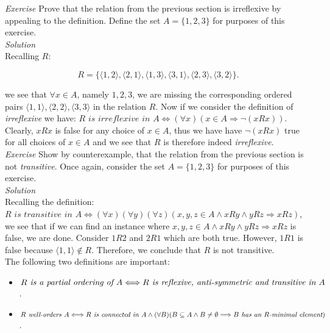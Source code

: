 \textit{Exercise} Prove that the relation from the previous section is irreflexive by appealing to the definition.  Define the set $A=\{1,2,3\}$ for purposes of this exercise.\\

\textit{Solution}\\

Recalling $R$:

\begin{displaymath}
R=\{\langle 1,2 \rangle, \langle 2,1 \rangle,  \langle 1,3 \rangle,  \langle 3,1 \rangle,  \langle 2,3 \rangle,  \langle 3,2 \rangle \}.
\end{displaymath}

we see that $\forall x \in A$, namely $1,2,3$, we are missing the corresponding ordered pairs $\langle 1,1 \rangle, \langle 2,2 \rangle, \langle 3,3 \rangle$ in the relation $R$.  Now if we consider the definition of \textit{irreflexive} we have: $R \textit{ is irreflexive in } A \Longleftrightarrow (\forall x)(x \in A \Longrightarrow \neg (x R x))$.  Clearly, $x R x$ is false for any choice of $x \in A$, thus we have have $\neg (x R x)$ true for all choices of $x \in A$ and we see that $R$ is therefore indeed \textit{irreflexive}.\\

\textit{Exercise} Show by counterexample, that the relation from the previous section is not \textit{transitive}.  Once again, consider the set $A=\{1,2,3\}$ for purposes of this exercise.\\

\textit{Solution}\\

Recalling the definition: $R \textit{ is transitive in } A \Longleftrightarrow (\forall x)(\forall y)(\forall z)(x,y,z \in A \land x R y \land y R z \Longrightarrow x R z)$, we see that if we can find an instance where $x,y,z \in A \land x R y \land y R z \Longrightarrow x R z$ is false, we are done.  Consider $1 R 2$ and $2 R 1$ which are both true.  However, $1 R 1$ is false because $\langle 1,1 \rangle \notin R.$  Therefore, we conclude that $R$ is not transitive.\\

The following two definitions are important:

\begin{itemize}
\item $R \textit{ is a partial ordering of }\index{partial ordering}A \Longleftrightarrow R \textit{ is reflexive, anti-symmetric and transitive in }A$.
\item $R \textit{ well-orders }\index{well-order}A \Longleftrightarrow R \textit{ is connected in } A \land (\forall B)(B \subseteq A \land B \ne \emptyset \Longrightarrow B \textit{ has an }R \textit{-minimal element})$.
\end{itemize}

